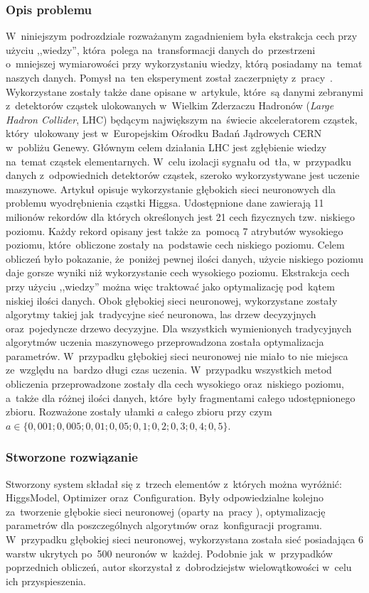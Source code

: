 \subsubsection{Opis problemu}
W~niniejszym podrozdziale rozważanym zagadnieniem była ekstrakcja cech przy użyciu ,,wiedzy'', która~polega na~transformacji danych do~przestrzeni o~mniejszej wymiarowości przy wykorzystaniu wiedzy, którą posiadamy na~temat naszych danych. Pomysł na~ten eksperyment został zaczerpnięty z~pracy~\cite{higgs1}. Wykorzystane zostały także dane opisane w~artykule, które~są danymi zebranymi z~detektorów cząstek ulokowanych w~Wielkim Zderzaczu Hadronów (\textit{Large Hadron Collider}, LHC) będącym największym na~świecie akceleratorem cząstek, który~ulokowany jest w~Europejskim Ośrodku Badań Jądrowych CERN w~pobliżu Genewy. Głównym celem działania LHC jest zgłębienie wiedzy na~temat cząstek elementarnych. W~celu izolacji sygnału od~tła, w~przypadku danych z~odpowiednich detektorów cząstek, szeroko wykorzystywane jest uczenie maszynowe. Artykuł opisuje wykorzystanie głębokich sieci neuronowych dla problemu wyodrębnienia cząstki Higgsa. Udostępnione dane zawierają 11 milionów rekordów dla których określonych jest 21 cech fizycznych tzw. niskiego poziomu. Każdy rekord opisany jest także za~pomocą 7 atrybutów wysokiego poziomu, które~obliczone zostały na~podstawie cech niskiego poziomu. Celem obliczeń było pokazanie, że~poniżej pewnej ilości danych, użycie niskiego poziomu daje gorsze wyniki niż wykorzystanie cech wysokiego poziomu. Ekstrakcja cech przy użyciu ,,wiedzy'' można więc traktować jako optymalizację pod~kątem niskiej ilości danych. Obok głębokiej sieci neuronowej, wykorzystane zostały algorytmy takiej jak~tradycyjne sieć neuronowa, las drzew decyzyjnych oraz~pojedyncze drzewo decyzyjne. Dla wszystkich wymienionych tradycyjnych algorytmów uczenia maszynowego przeprowadzona została optymalizacja parametrów. W~przypadku głębokiej sieci neuronowej nie miało to nie miejsca ze~względu na~bardzo długi czas uczenia. W~przypadku wszystkich metod obliczenia przeprowadzone zostały dla cech wysokiego oraz~niskiego poziomu, a~także dla różnej ilości danych, które~były fragmentami całego udostępnionego zbioru. Rozważone zostały ułamki $a$ całego zbioru przy czym $a\in\{0,001; 0,005; 0,01; 0,05; 0,1; 0,2; 0,3; 0,4; 0,5\}$. 

\subsubsection{Stworzone rozwiązanie}
Stworzony system składał się z~trzech elementów z~których można wyróżnić: HiggsModel, Optimizer oraz~Configuration. Były odpowiedzialne kolejno za~tworzenie głębokie sieci neuronowej (oparty na~pracy \cite{higgs2}), optymalizację parametrów dla poszczególnych algorytmów oraz~konfiguracji programu. W~przypadku głębokiej sieci neuronowej, wykorzystana została sieć posiadająca 6 warstw ukrytych po~500 neuronów w~każdej. Podobnie jak~w~przypadków poprzednich obliczeń, autor skorzystał z~dobrodziejstw wielowątkowości w~celu ich przyspieszenia.


